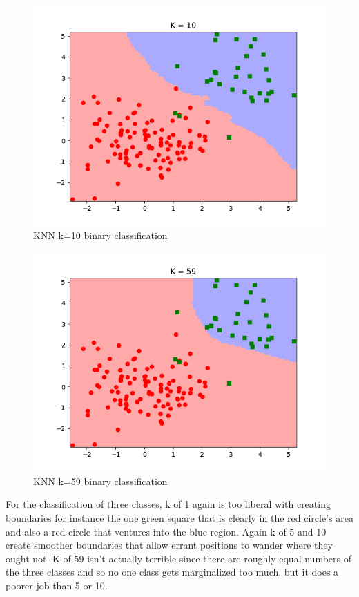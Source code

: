 \documentclass[10pt]{article}
\begin{document}
\begin{itemize}
\begin{figure}[H]
\centering
  \includegraphics[width=\linewidth]{code/knn_binary_data-k-10.png}
 \caption{KNN k=10 binary classification}
\label{label}
\end{figure}

\begin{figure}[H]
\centering
  \includegraphics[width=\linewidth]{code/knn_binary_data-k-59.png}
 \caption{KNN k=59 binary classification}
\label{label}
\end{figure}

For the classification of three classes, k of 1 again is too liberal with creating boundaries for instance the one green square that is clearly in the red circle's area and also a red circle that ventures into the blue region. Again k of 5 and 10 create smoother boundaries that allow errant positions to wander where they ought not. K of 59 isn't actually terrible since there are roughly equal numbers of the three classes and so no one class gets marginalized too much, but it does a poorer job than 5 or 10.


\end{itemize}
\end{document}
